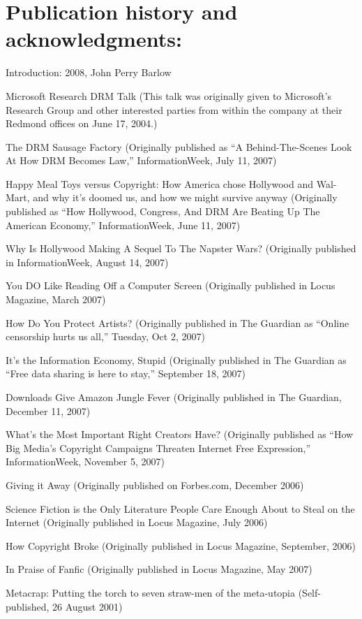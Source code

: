 \section{Publication history and acknowledgments:}
\begin{parlist}
Introduction: 2008, John Perry Barlow

Microsoft Research DRM Talk (This talk was originally given to
Microsoft's Research Group and other interested parties from within
the company at their Redmond offices on June 17, 2004.)

The DRM Sausage Factory (Originally published as ``A
Behind-The-Scenes Look At How DRM Becomes Law,'' InformationWeek,
July 11, 2007)

Happy Meal Toys versus Copyright: How America chose Hollywood and
Wal-Mart, and why it's doomed us, and how we might survive anyway
(Originally published as ``How Hollywood, Congress, And DRM Are
Beating Up The American Economy,'' InformationWeek, June 11, 2007)

Why Is Hollywood Making A Sequel To The Napster Wars? (Originally
published in InformationWeek, August 14, 2007)

You DO Like Reading Off a Computer Screen (Originally published in
Locus Magazine, March 2007)

How Do You Protect Artists? (Originally published in The Guardian
as ``Online censorship hurts us all,'' Tuesday, Oct 2, 2007)

It's the Information Economy, Stupid (Originally published in The
Guardian as ``Free data sharing is here to stay,'' September 18,
2007)

Downloads Give Amazon Jungle Fever (Originally published in The
Guardian, December 11, 2007)

What's the Most Important Right Creators Have? (Originally
published as ``How Big Media's Copyright Campaigns Threaten Internet
Free Expression,'' InformationWeek, November 5, 2007)

Giving it Away (Originally published on Forbes.com, December 2006)

Science Fiction is the Only Literature People Care Enough About to
Steal on the Internet (Originally published in Locus Magazine, July
2006)

How Copyright Broke (Originally published in Locus Magazine,
September, 2006)

In Praise of Fanfic (Originally published in Locus Magazine, May
2007)

Metacrap: Putting the torch to seven straw-men of the meta-utopia
(Self-published, 26 August 2001)


\end{parlist}
